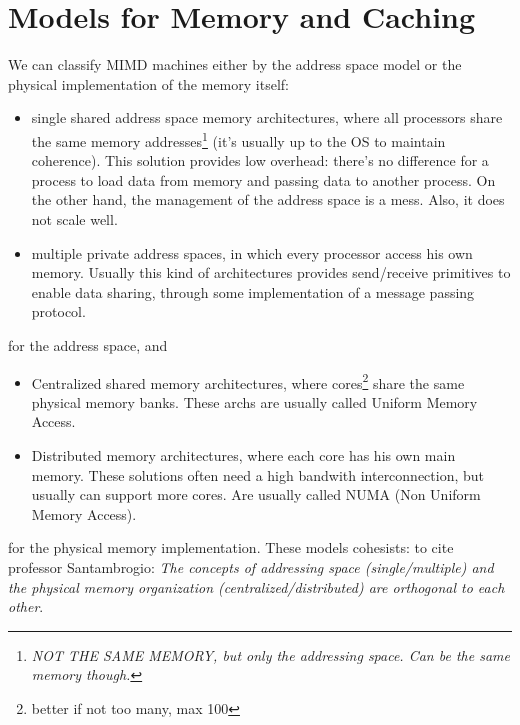 \documentclass[10pt,a4paper]{article}
\begin{document}
		\section{Models for Memory and Caching}
			We can classify MIMD machines either by the address space model or the physical implementation of the memory itself:
			\begin{itemize}
				\item single shared address space memory architectures, where all processors share the same memory addresses\footnote{\emph{NOT THE SAME MEMORY, but only the addressing space. Can be the same memory though.}} (it's usually up to the OS to maintain coherence). This solution provides low overhead: there's no difference for a process to load data from memory and passing data to another process. On the other hand, the management of the address space is a mess. Also, it does not scale well.
				\item multiple private address spaces, in which every processor access his own memory. Usually this kind of architectures provides send/receive primitives to enable data sharing, through some implementation of a message passing protocol. 
			\end{itemize}
			for the address space, and
			\begin{itemize}
				\item Centralized shared memory architectures, where cores\footnote{better if not too many, max 100} share the same physical memory banks. These archs are usually called Uniform Memory Access.
				\item Distributed memory architectures, where each core has his own main memory. These solutions often need a high bandwith interconnection, but usually can support more cores. Are usually called NUMA (Non Uniform Memory Access).
			\end{itemize}
			for the physical memory implementation. These models cohesists: to cite professor Santambrogio: \emph{The concepts of addressing space (single/multiple) and the physical memory organization (centralized/distributed) are orthogonal to each other}.
\end{document}
